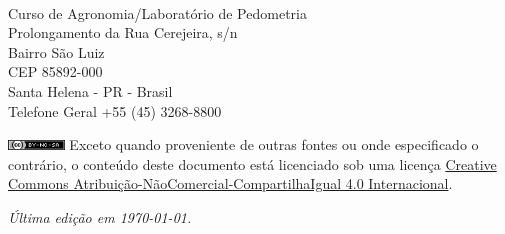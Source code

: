 \newpage
\nopagecolor
\begin{fullwidth}
~\vfill
\thispagestyle{empty}
\setlength{\parindent}{0pt}
\setlength{\parskip}{\baselineskip}

\par{}

\par{Curso de Agronomia/Laboratório de Pedometria\\Prolongamento da Rua Cerejeira, s/n\\Bairro São Luiz\\CEP 85892-000\\Santa Helena - PR - Brasil\\Telefone Geral +55 (45) 3268-8800}

\par{}

\par\includegraphics[width=1.5cm]{img/cc-by-nc-sa.png} Exceto quando proveniente de outras fontes ou onde especificado o contrário, o conteúdo deste documento está licenciado sob uma licença \href{http://creativecommons.org/licenses/by-nc-sa/4.0/}{Creative Commons Atribuição-NãoComercial-CompartilhaIgual 4.0 Internacional}.

\par\textit{Última edição em \today.}
\end{fullwidth}
